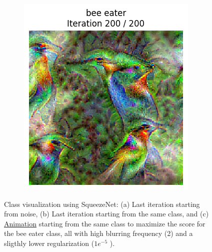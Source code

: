 \begin{figure}[H]
\begin{subfigure}{.33\textwidth}
        \includegraphics[width=\linewidth]{SqueezeNet/bird_animated_same_init_img_reg++_last_frame.png}
        \caption{}
        \label{fig:class_viz_start_image:png}
    \end{subfigure}%
    \begin{subfigure}{.33\textwidth}
        \centering
        \begin{frame}{}
        \end{frame}
        \caption{} %
        \label{fig:class_viz_start_image:vid}
    \end{subfigure}
    \caption{Class visualization using SqueezeNet: (a) Last iteration starting from noise, (b) Last iteration starting from the same class, and (c) \href{gifs/SqueezeNet_bird_animated_same_init_img_reg++.mp4}{Animation} starting from the same class to maximize the score for the bee eater class, all with high blurring frequency (2) and a sligthly lower regularization ($ 1e^{-5} $ ).}
    \label{fig:class_viz_start_image}
\end{figure}

